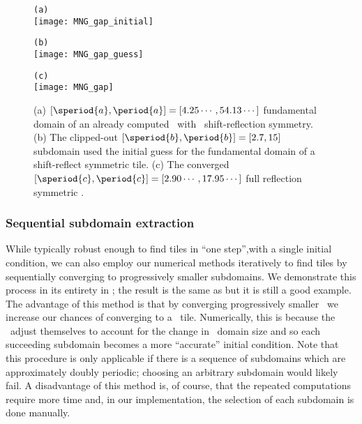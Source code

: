 \begin{figure}
\begin{minipage}[height=.3\textheight]{.5\textwidth}
\centering \small{\texttt{(a)}}\\
\texttt{[image: MNG\_gap\_initial]}
\end{minipage}
\begin{minipage}[height=.3\textheight]{.5\textwidth}
\centering \small{\texttt{(b)}}\\
\texttt{[image: MNG\_gap\_guess]}
\end{minipage}
\begin{minipage}[height=.1\textheight]{\textwidth}
\centering \small{\texttt{(c)}}\\
\texttt{[image: MNG\_gap]}
\end{minipage}
\caption{ \label{fig:gap}
(a)
$[\speriod{a},\period{a}]=[4.25\cdots,54.13\cdots]$ fundamental domain
of an already computed \twot\ with \spt\ shift-reflection symmetry.
(b)
The clipped-out $[\speriod{b},\period{b}]=[2.7,15]$ subdomain used the
initial guess for the fundamental domain of a shift-reflect symmetric tile.
(c)
The converged $[\speriod{c},\period{c}]=[2.90\cdots,17.95\cdots]$ full
reflection symmetric \twot.
}
\end{figure}


\subsubsection{Sequential subdomain extraction}
While typically robust enough to find tiles in
``one step'',\ie with a single initial condition,
we can also employ our numerical methods iteratively
to find tiles by sequentially converging to
progressively smaller subdomains. We demonstrate
this process in its entirety in ; the
result is the same as  but it is still a good
example.
The advantage of this method is that
by converging progressively smaller \twots\
we increase
our chances of converging to a \spt\ tile.
Numerically, this is because the \twots\
adjust themselves to account for the change in \spt\
domain size and so each succeeding subdomain becomes
a more ``accurate'' initial condition. Note that this
procedure is only applicable if there is a sequence of
subdomains which are approximately doubly periodic;
choosing an arbitrary subdomain would likely fail.
A disadvantage of this method is, of course, that
the repeated computations require more time
and, in our implementation,
the selection of each subdomain is done manually.


